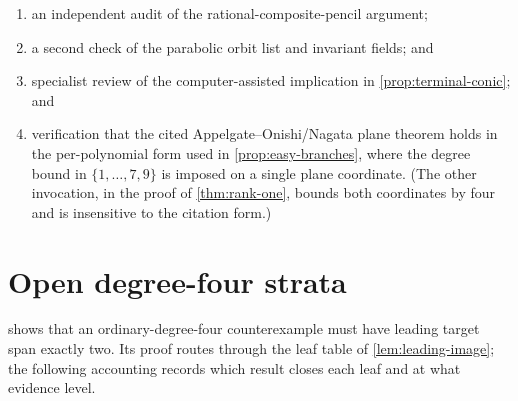 \documentclass[11pt,reqno]{amsart}
\begin{document}
\begin{enumerate}[label=(\arabic*)]
\item an independent audit of the rational-composite-pencil argument;
\item a second check of the parabolic orbit list and invariant fields; and
\item specialist review of the computer-assisted implication in
\cref{prop:terminal-conic}; and
\item verification that the cited Appelgate--Onishi/Nagata plane theorem
holds in the per-polynomial form used in \cref{prop:easy-branches},
where the degree bound in \(\{1,\dots,7,9\}\) is imposed on a single
plane coordinate.  (The other invocation, in the proof of
\cref{thm:rank-one}, bounds both coordinates by four and is insensitive
to the citation form.)
\end{enumerate}

\section{Open degree-four strata}
\label{sec:open-degree-four}

 shows that an ordinary-degree-four
counterexample must have leading target span exactly two.  Its proof
routes through the leaf table of \cref{lem:leading-image}; the following
accounting records which result closes each leaf and at what evidence
level.
\end{document}
